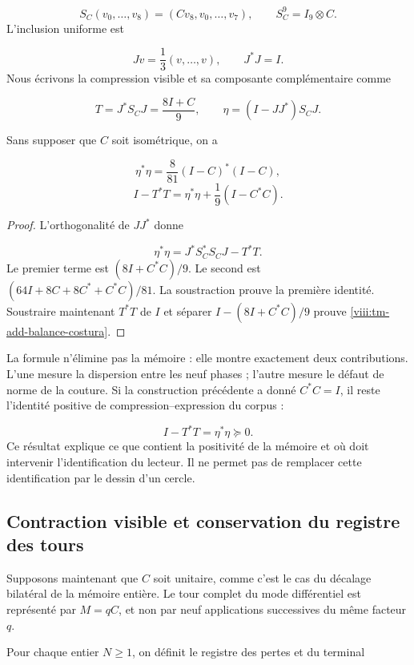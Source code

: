 \[
S_C(v_0,\ldots,v_8)=(Cv_8,v_0,\ldots,v_7),
\qquad S_C^9=I_9\otimes C.
\]
L'inclusion uniforme est

\[
Jv=\frac13(v,\ldots,v),\qquad J^*J=I.
\]
Nous écrivons la compression visible et sa composante complémentaire comme

\[
T=J^*S_CJ=\frac{8I+C}{9},\qquad
\eta=(I-JJ^*)S_CJ.
\]
\begin{proposition}
\label{viii:tm-add-proposicion-costura-1}
Sans supposer que \(C\) soit isométrique, on a

\[
\eta^*\eta=\frac8{81}(I-C)^*(I-C),
\]
\begin{equation}
\boxed{I-T^*T=\eta^*\eta+\frac19(I-C^*C).}
\label{viii:tm-add-balance-costura}
\end{equation}
\end{proposition}

\begin{proof}
L'orthogonalité de \(JJ^*\) donne

\[
\eta^*\eta=J^*S_C^*S_CJ-T^*T.
\]
Le premier terme est \((8I+C^*C)/9\). Le second est \((64I+8C+8C^*+C^*C)/81\). La soustraction prouve la première identité. Soustraire maintenant \(T^*T\) de \(I\) et séparer \(I-(8I+C^*C)/9\) prouve \eqref{viii:tm-add-balance-costura}.
\end{proof}

La formule n'élimine pas la mémoire : elle montre exactement deux contributions. L'une mesure la dispersion entre les neuf phases ; l'autre mesure le défaut de norme de la couture. Si la construction précédente a donné \(C^*C=I\), il reste l'identité positive de compression–expression du corpus :

\[
I-T^*T=\eta^*\eta\succeq0.
\]
Ce résultat explique ce que contient la positivité de la mémoire et où doit intervenir l'identification du lecteur. Il ne permet pas de remplacer cette identification par le dessin d'un cercle.


\subsection{Contraction visible et conservation du registre des tours}
\label{viii:tm-add-c3}
Supposons maintenant que \(C\) soit unitaire, comme c'est le cas du décalage bilatéral de la mémoire entière. Le tour complet du mode différentiel est représenté par \(M=qC\), et non par neuf applications successives du même facteur \(q\).

Pour chaque entier \(N\geq1\), on définit le registre des pertes et du terminal

